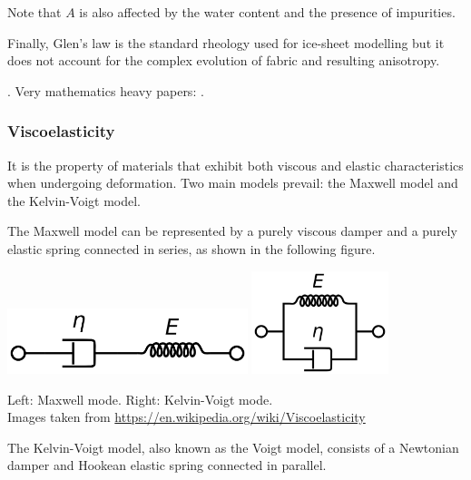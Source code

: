 Note that $A$ is also affected by the water content and the presence of impurities. 

Finally, Glen's law is the standard rheology used for ice-sheet modelling 
but it does not account for the complex evolution of fabric and resulting anisotropy.

\Literature \cite{grev97,krab16,grbl09,issg15,jidb17,heah18}. Very mathematics heavy papers: \cite{jora11,chgp13}.

\subsubsection{Viscoelasticity} 


It is the property of materials that exhibit both viscous and elastic 
characteristics when undergoing deformation.
Two main models prevail: the Maxwell model and the Kelvin-Voigt model. 

The Maxwell model can be represented by a purely viscous damper and 
a purely elastic spring connected in series, as shown in the following figure. 

\begin{center}
\includegraphics[width=7cm]{images/rheology/Maxwell_diagram}
\hspace{1cm}
\includegraphics[width=4cm]{images/rheology/Kelvin_Voigt_diagram}

{\captionfont Left: Maxwell mode. Right: Kelvin-Voigt mode.\\ 
Images taken from \url{https://en.wikipedia.org/wiki/Viscoelasticity}}
\end{center}

The Kelvin-Voigt model, also known as the Voigt model, 
consists of a Newtonian damper and Hookean elastic spring connected in parallel.

